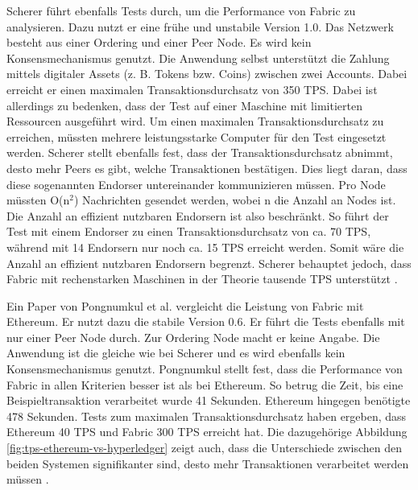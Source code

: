 Scherer führt ebenfalls Tests durch, um die Performance von Fabric zu analysieren. Dazu nutzt er eine frühe und unstabile Version 1.0. Das Netzwerk besteht aus einer Ordering und einer Peer Node. Es wird kein Konsensmechanismus genutzt. Die Anwendung selbst unterstützt die Zahlung mittels digitaler Assets (z. B. Tokens bzw. Coins) zwischen zwei Accounts. Dabei erreicht er einen maximalen Transaktionsdurchsatz von 350 \acs{TPS}. Dabei ist allerdings zu bedenken, dass der Test auf einer Maschine mit limitierten Ressourcen ausgeführt wird. Um einen maximalen Transaktionsdurchsatz zu erreichen, müssten mehrere leistungsstarke Computer für den Test eingesetzt werden. Scherer stellt ebenfalls fest, dass der Transaktionsdurchsatz abnimmt, desto mehr Peers es gibt, welche Transaktionen bestätigen. Dies liegt daran, dass diese sogenannten Endorser untereinander kommunizieren müssen. Pro Node müssten O(n$^2$) Nachrichten gesendet werden, wobei n die Anzahl an Nodes ist. Die Anzahl an effizient nutzbaren Endorsern ist also beschränkt. So führt der Test mit einem Endorser zu einen Transaktionsdurchsatz von ca. 70 \acs{TPS}, während mit 14 Endorsern nur noch ca. 15 \acs{TPS} erreicht werden. Somit wäre die Anzahl an effizient nutzbaren Endorsern begrenzt. Scherer behauptet jedoch, dass Fabric mit rechenstarken Maschinen in der Theorie tausende \acs{TPS} unterstützt \cite{SchererPerformanceScalabilityBlockchain2017}.

Ein Paper von Pongnumkul et al. vergleicht die Leistung von Fabric mit Ethereum. Er nutzt dazu die stabile Version 0.6. Er führt die Tests ebenfalls mit nur einer Peer Node durch. Zur Ordering Node macht er keine Angabe. Die Anwendung ist die gleiche wie bei Scherer und es wird ebenfalls kein Konsensmechanismus genutzt. Pongnumkul stellt fest, dass die Performance von Fabric in allen Kriterien besser ist als bei Ethereum. So betrug die Zeit, bis eine Beispieltransaktion verarbeitet wurde 41 Sekunden. Ethereum hingegen benötigte 478 Sekunden. Tests zum maximalen Transaktionsdurchsatz haben ergeben, dass Ethereum 40 \acs{TPS} und Fabric 300 \acs{TPS} erreicht hat. Die dazugehörige Abbildung \ref{fig:tps-ethereum-vs-hyperledger} zeigt auch, dass die Unterschiede zwischen den beiden Systemen signifikanter sind, desto mehr Transaktionen verarbeitet werden müssen \cite{PongnumkulPerformanceAnalysisPrivate2017}.


